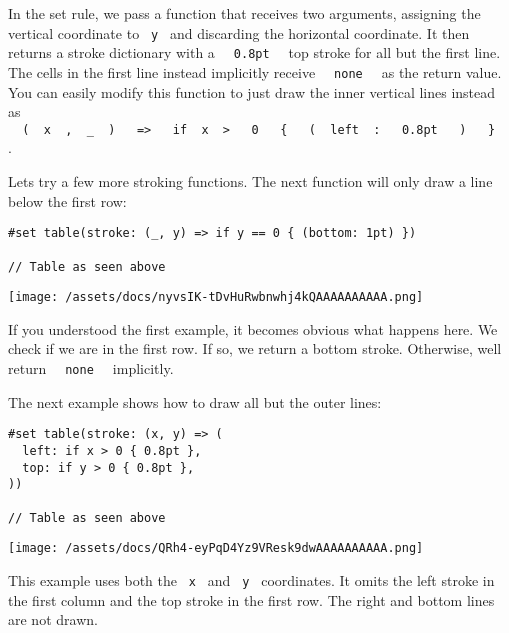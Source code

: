 In the set rule, we pass a function that receives two arguments,
assigning the vertical coordinate to \texttt{\ y\ } and discarding the
horizontal coordinate. It then returns a stroke dictionary with a
\texttt{\ }{\texttt{\ 0.8pt\ }}\texttt{\ } top stroke for all but the
first line. The cells in the first line instead implicitly receive
\texttt{\ }{\texttt{\ none\ }}\texttt{\ } as the return value. You can
easily modify this function to just draw the inner vertical lines
instead as
\texttt{\ }{\texttt{\ (\ }}\texttt{\ x\ }{\texttt{\ ,\ }}\texttt{\ \_\ }{\texttt{\ )\ }}\texttt{\ }{\texttt{\ =\textgreater{}\ }}\texttt{\ }{\texttt{\ if\ }}\texttt{\ x\ }{\texttt{\ \textgreater{}\ }}\texttt{\ }{\texttt{\ 0\ }}\texttt{\ }{\texttt{\ \{\ }}\texttt{\ }{\texttt{\ (\ }}\texttt{\ left\ }{\texttt{\ :\ }}\texttt{\ }{\texttt{\ 0.8pt\ }}\texttt{\ }{\texttt{\ )\ }}\texttt{\ }{\texttt{\ \}\ }}\texttt{\ }
.

Let\textquotesingle s try a few more stroking functions. The next
function will only draw a line below the first row:

\begin{verbatim}
#set table(stroke: (_, y) => if y == 0 { (bottom: 1pt) })

// Table as seen above
\end{verbatim}

\texttt{[image: /assets/docs/nyvsIK-tDvHuRwbnwhj4kQAAAAAAAAAA.png]}

If you understood the first example, it becomes obvious what happens
here. We check if we are in the first row. If so, we return a bottom
stroke. Otherwise, we\textquotesingle ll return
\texttt{\ }{\texttt{\ none\ }}\texttt{\ } implicitly.

The next example shows how to draw all but the outer lines:

\begin{verbatim}
#set table(stroke: (x, y) => (
  left: if x > 0 { 0.8pt },
  top: if y > 0 { 0.8pt },
))

// Table as seen above
\end{verbatim}

\texttt{[image: /assets/docs/QRh4-eyPqD4Yz9VResk9dwAAAAAAAAAA.png]}

This example uses both the \texttt{\ x\ } and \texttt{\ y\ }
coordinates. It omits the left stroke in the first column and the top
stroke in the first row. The right and bottom lines are not drawn.

